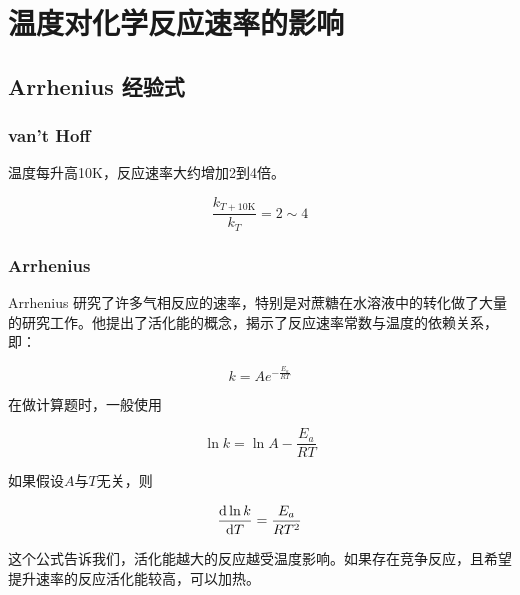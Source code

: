 \section{温度对化学反应速率的影响}


\subsection{Arrhenius 经验式}
\subsubsection{van't Hoff}

温度每升高10K，反应速率大约增加2到4倍。

\begin{equation*}
    \frac{k_{T + 10 \mathrm{K}}}{k_T} = 2 \sim 4
\end{equation*}


\subsubsection{Arrhenius}

Arrhenius 研究了许多气相反应的速率，特别是对蔗糖在水溶液中的转化做了大量的研究工作。他提出了活化能的概念，揭示了反应速率常数与温度的依赖关系，即：

\begin{equation*}
    k = Ae^{-\frac{E_a}{RT}}
\end{equation*}

在做计算题时，一般使用

\begin{equation*}
    \ln k = \ln A - \frac{E_a}{RT}
\end{equation*}

如果假设$A$与$T$无关，则

\begin{equation*}
    \frac{\mathrm{d} \ln k}{\mathrm{d} T} = \frac{E_a}{RT^2}
\end{equation*}

这个公式告诉我们，活化能越大的反应越受温度影响。如果存在竞争反应，且希望提升速率的反应活化能较高，可以加热。
